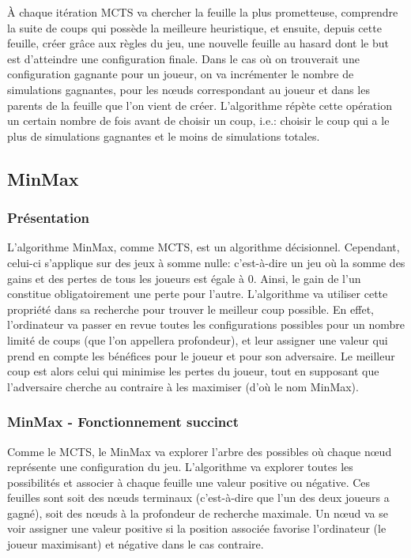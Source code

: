 À chaque itération MCTS va chercher la feuille la plus prometteuse, comprendre la suite de coups qui possède la meilleure heuristique, 
et ensuite, depuis cette feuille, créer grâce aux règles du jeu, une nouvelle feuille au hasard dont le but est d'atteindre une configuration finale.
Dans le cas où on trouverait une configuration gagnante pour un joueur, on va incrémenter le nombre de simulations gagnantes, pour les nœuds
correspondant au joueur et dans les parents de la feuille que l'on vient de créer.
L'algorithme répète cette opération un certain nombre de fois avant de choisir un coup, i.e.: choisir le coup qui a le plus de simulations
gagnantes et le moins de simulations totales.



\subsection{MinMax}

\subsubsection{Présentation}
L'algorithme MinMax, comme MCTS, est un algorithme décisionnel. Cependant, celui-ci s'applique sur des jeux à somme nulle: c'est-à-dire
un jeu où la somme des gains et des pertes de tous les joueurs est égale à 0. Ainsi, le gain de l'un constitue 
obligatoirement une perte pour l'autre. L'algorithme va utiliser cette propriété dans sa recherche pour trouver le meilleur coup possible.
En effet, l'ordinateur va passer en revue toutes les configurations possibles pour un nombre limité de coups (que l'on appellera profondeur), 
et leur assigner une valeur qui prend en compte les bénéfices pour le joueur et pour son adversaire. Le meilleur coup est alors celui qui 
minimise les pertes du joueur, tout en supposant que l'adversaire cherche au contraire à les maximiser (d'où le nom MinMax).

\subsubsection{MinMax - Fonctionnement succinct}
Comme le MCTS, le MinMax va explorer l'arbre des possibles où chaque nœud représente une configuration du jeu. 
L'algorithme va explorer toutes les possibilités et associer à chaque feuille une valeur positive ou négative. Ces feuilles sont
soit des nœuds terminaux (c'est-à-dire que l'un des deux joueurs a gagné), soit des nœuds à la profondeur de recherche maximale.
Un nœud va se voir assigner une valeur positive si la position associée favorise l'ordinateur (le joueur maximisant) 
et négative dans le cas contraire.

